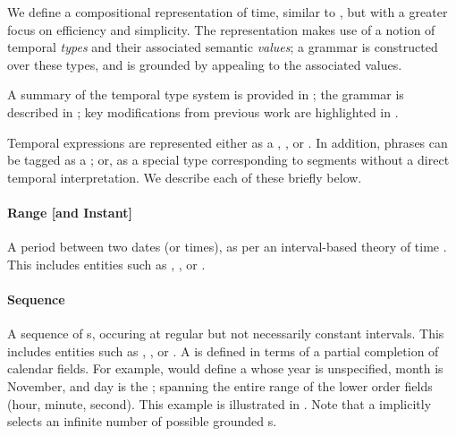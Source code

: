 We define a compositional representation of time, similar to \me, but with
  a greater focus on efficiency and simplicity.
The representation makes use of a notion of temporal \textit{types} and
  their associated semantic \textit{values};
  a grammar is constructed over these types, and is grounded by appealing
  to the associated values.

A summary of the temporal type system is provided in ;
  the grammar is described in ;
  key modifications from previous work are highlighted in .

Temporal expressions are represented either as a , ,
	or .
In addition, phrases can be tagged as a ; or, as a
  special  type corresponding to segments 
  without a direct temporal interpretation.
We describe each of these briefly below.

\paragraph{Range [and Instant]}
A period between two dates (or times), as per an interval-based theory of
  time \cite{key:1981allen-temporal}.
This includes entities such as , , or
	.


\paragraph{Sequence}
A sequence of s, occuring at regular but not necessarily constant
  intervals.
This includes entities such as , , or
	.
A  is defined in terms of a partial completion of calendar fields.
For example,  would define a  whose
  year is unspecified,
  month is November, and day is the ; spanning the entire range of the
  lower order fields (hour, minute, second).
This example is illustrated in .
Note that a  implicitly selects an infinite number of possible 
  grounded s.

